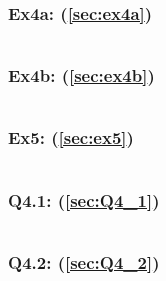\documentclass[12pt]{article}
\begin{document}
\subsubsection{Ex4a: (\ref{sec:ex4a})}\label{appendix:ex4a}
\inputminted{matlab}{matlab/ex4a.m}

\subsubsection{Ex4b: (\ref{sec:ex4b})}\label{appendix:ex4b}
\inputminted{matlab}{matlab/ex4b.m}

\subsubsection{Ex5: (\ref{sec:ex5})}\label{appendix:ex5}
\inputminted{matlab}{matlab/ex5.m}

\subsubsection{Q4.1: (\ref{sec:Q4_1})}\label{appendix:Q4_1}
\inputminted{matlab}{matlab/Q4_1.m}

\subsubsection{Q4.2: (\ref{sec:Q4_2})}\label{appendix:Q4_2}
\inputminted{matlab}{matlab/Q4_2.m}
\end{document}
